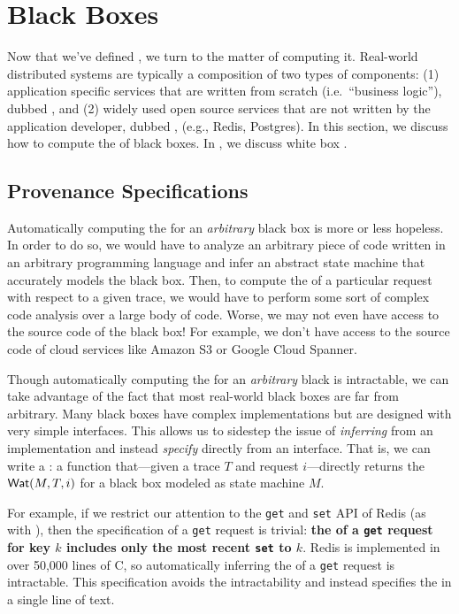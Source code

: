 \section{Black Boxes}
Now that we've defined \watprovenance{}, we turn to the matter of computing it.
Real-world distributed systems are typically a composition of two types of
components: (1) application specific services that are written from scratch
(i.e.\ ``business logic''), dubbed , and (2) widely used
open source services that are not written by the application developer, dubbed
, (e.g., Redis, Postgres). In this section, we discuss how
to compute the \watprovenance{} of black boxes. In , we
discuss white box \watprovenance{}.

\subsection{Provenance Specifications}
Automatically computing the \watprovenance{} for an \emph{arbitrary} black box
is more or less hopeless. In order to do so, we would have to analyze an
arbitrary piece of code written in an arbitrary programming language and infer
an abstract state machine that accurately models the black box. Then, to
compute the \watprovenance{} of a particular request with respect to a given
trace, we would have to perform some sort of complex code analysis over a large
body of code. Worse, we may not even have access to the source code of the
black box!  For example, we don't have access to the source code of cloud
services like Amazon S3 or Google Cloud Spanner.

\newcommand{\kvget}{\texttt{get}}
\newcommand{\kvset}{\texttt{set}}

Though automatically computing the \watprovenance{} for an \emph{arbitrary}
black is intractable, we can take advantage of the fact that most real-world
black boxes are far from arbitrary. Many black boxes have complex
implementations but are designed with very simple interfaces.  This allows us
to sidestep the issue of \emph{inferring} \watprovenance{} from an
implementation and instead \emph{specify} \watprovenance{} directly from an
interface. That is, we can write a : a
function that---given a trace $T$ and request $i$---directly returns the
\watprovenance{} $\textsf{Wat}(M, T, i)$ for a black box modeled as state machine $M$.

For example, if we restrict our attention to the \kvget{} and \kvset{} API of
Redis (as with ), then the \watprovenance{}
specification of a \kvget{} request is trivial: \textbf{the \watprovenance{} of
a \kvget{} request for key $k$ includes only the most recent \kvset{} to
$k$}. Redis is implemented in over 50,000 lines of C, so automatically
inferring the \watprovenance{} of a \kvget{} request is intractable. This
\watprovenance{} specification avoids the intractability and instead specifies
the \watprovenance{} in a single line of text.

